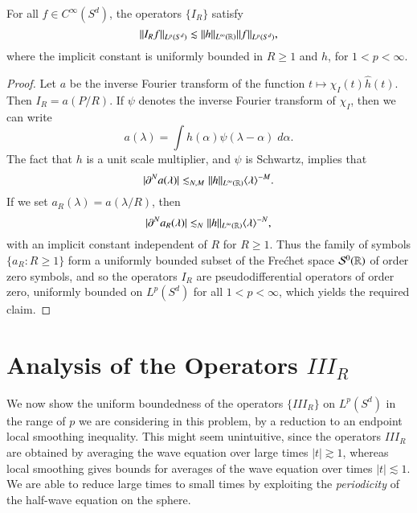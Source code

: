 \begin{lemma} \label{SmallTimeInequalityLemma}
    For all $f \in C^\infty(S^d)$, the operators $\{ I_R \}$ satisfy
    \[ \| I_R f \|_{L^p(S^d)} \lesssim \| h \|_{L^\infty(\operatorname{\mathbb{R}})} \| f \|_{L^p(S^d)}, \] 
    where the implicit constant is uniformly bounded in $R \geq 1$ and $h$, for $1 < p < \infty$.
\end{lemma}
\begin{proof}
    Let $a$ be the inverse Fourier transform of the function $t \mapsto \chi_I(t) \widehat{h}(t)$. Then $I_R = a(P/R)$. If $\psi$ denotes the inverse Fourier transform of $\chi_I$, then we can write
    \[ a(\lambda) = \int h(\alpha) \psi(\lambda - \alpha)\; d\alpha. \]
    The fact that $h$ is a unit scale multiplier, and $\psi$ is Schwartz, implies that
    \[ |\partial^N a(\lambda)| \lesssim_{N,M} \| h \|_{L^\infty(\operatorname{\mathbb{R}})} \langle \lambda \rangle^{-M}. \]
    If we set $a_R(\lambda) = a(\lambda / R)$, then
    \[ |\partial^N a_R(\lambda)| \lesssim_N \| h \|_{L^\infty(\operatorname{\mathbb{R}})} \langle \lambda \rangle^{-N}, \]
    with an implicit constant independent of $R$ for $R \geq 1$. Thus the family of symbols $\{ a_R : R \geq 1 \}$ form a uniformly bounded subset of the Fre\'{c}het space $\mathcal{S}^0(\operatorname{\mathbb{R}})$ of order zero symbols, and so the operators $I_R$ are pseudodifferential operators of order zero, uniformly bounded on $L^p(S^d)$ for all $1 < p < \infty$, which yields the required claim.
\end{proof}

\section{Analysis of the Operators $III_R$}

We now show the uniform boundedness of the operators $\{ III_R \}$ on $L^p(S^d)$ in the range of $p$ we are considering in this problem, by a reduction to an endpoint local smoothing inequality. This might seem unintuitive, since the operators $III_R$ are obtained by averaging the wave equation over large times $|t| \gtrsim 1$, whereas local smoothing gives bounds for averages of the wave equation over times $|t| \lesssim 1$. We are able to reduce large times to small times by exploiting the \emph{periodicity} of the half-wave equation on the sphere.

